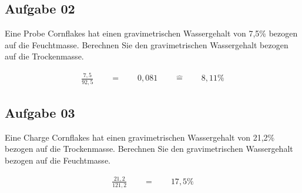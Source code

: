 \documentclass[a4paper,10pt]{article}
\begin{document}
\subsection*{Aufgabe 02}
Eine Probe Cornflakes hat einen gravimetrischen Wassergehalt von 7,5\% bezogen auf die
Feuchtmasse. Berechnen Sie den gravimetrischen Wassergehalt bezogen auf die
Trockenmasse.

\begin{align*}
\frac{7,5}{92,5}  \qquad = \qquad 0,081 \qquad \hat{=} \qquad 8,11 \%
\end{align*}


\subsection*{Aufgabe 03}
Eine Charge Cornflakes hat einen gravimetrischen Wassergehalt von 21,2\% bezogen auf die
Trockenmasse. Berechnen Sie den gravimetrischen Wassergehalt bezogen auf die
Feuchtmasse.

\begin{align*}
\frac{21,2}{121,2} \qquad = \qquad 17,5 \%
\end{align*}
\end{document}
